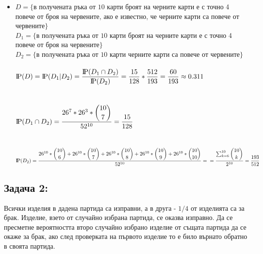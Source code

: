 \documentclass[french]{article}
\newcommand{\probP}{\text{I\kern-0.15em P}}
\begin{document}
\begin{itemize}
		\item $D = \{$в получената ръка от $10$ карти броят на черните карти е с точно 4 повече от броя на червените, ако е известно, че черните карти са повече от червените$\}$ \\
		$D_1 = \{$в получената ръка от $10$ карти броят на черните карти е с точно 4 повече от броя на червените$\}$ \\
		$D_2 = \{$в получената ръка от $10$ карти черните карти са повече от червените$\}$ \\
		\\
		$\probP({D}) = \probP({D_1} | {D_2}) = \dfrac{\probP({D_1} \cap {D_2})}{\probP({D_2})} = \dfrac{15}{128} * \dfrac{512}{193} = \dfrac{60}{193} \approx 0.311$ \\
		\\ \\
		$\probP({D_1} \cap {D_2}) = \dfrac{26^7*26^3*\dbinom{10}{7}}{52^{10}} = \dfrac{15}{128}$ \\
		\\ \\
		$\probP({D_2}) = \dfrac{26^{10}*\dbinom{10}{6} + 26^{10}*\dbinom{10}{7} + 26^{10}*\dbinom{10}{8} + 26^{10}*\dbinom{10}{9} + 26^{10}*\dbinom{10}{10}}{52^{10}} = \\ = \dfrac{\sum_{k=6}^{10}\dbinom{10}{k}}{2^{10}} = \dfrac{193}{512}$
	\end{itemize}


	\subsection*{Задача 2:}
	Всички изделия в дадена партида са изправни, а в друга - $1/4$ от изделията са за брак. Изделие, взето от случайно избрана партида, се оказва изправно. Да се пресметне вероятността второ случайно избрано изделие от същата партида да се окаже за брак, ако след проверката на първото изделие то е било върнато обратно в своята партида.
	
\end{document}
